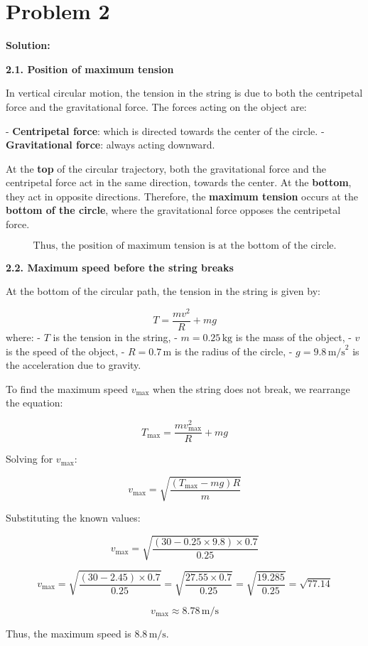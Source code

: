 \section{Problem 2}

\textbf{Solution:}

\textbf{2.1. Position of maximum tension}

In vertical circular motion, the tension in the string is due to both the centripetal force and the gravitational force. The forces acting on the object are:

- \textbf{Centripetal force}: which is directed towards the center of the circle.
- \textbf{Gravitational force}: always acting downward.

At the \textbf{top} of the circular trajectory, both the gravitational force and the centripetal force act in the same direction, towards the center. At the \textbf{bottom}, they act in opposite directions. Therefore, the \textbf{maximum tension} occurs at the \textbf{bottom of the circle}, where the gravitational force opposes the centripetal force.

\[
\text{Thus, the position of maximum tension is at the bottom of the circle.}
\]

\textbf{2.2. Maximum speed before the string breaks}

At the bottom of the circular path, the tension in the string is given by:

\[
T = \frac{mv^2}{R} + mg
\]
where:
- \( T \) is the tension in the string,
- \( m = 0.25 \, \text{kg} \) is the mass of the object,
- \( v \) is the speed of the object,
- \( R = 0.7 \, \text{m} \) is the radius of the circle,
- \( g = 9.8 \, \text{m/s}^2 \) is the acceleration due to gravity.

To find the maximum speed \( v_{\text{max}} \) when the string does not break, we rearrange the equation:

\[
T_{\text{max}} = \frac{mv_{\text{max}}^2}{R} + mg
\]

Solving for \( v_{\text{max}} \):

\[
v_{\text{max}} = \sqrt{\frac{(T_{\text{max}} - mg)R}{m}}
\]

Substituting the known values:

\[
v_{\text{max}} = \sqrt{\frac{(30 - 0.25 \times 9.8) \times 0.7}{0.25}}
\]

\[
v_{\text{max}} = \sqrt{\frac{(30 - 2.45) \times 0.7}{0.25}} = \sqrt{\frac{27.55 \times 0.7}{0.25}} = \sqrt{\frac{19.285}{0.25}} = \sqrt{77.14}
\]

\[
v_{\text{max}} \approx 8.78 \, \text{m/s}
\]

Thus, the maximum speed is \( \boxed{8.8 \, \text{m/s}} \).